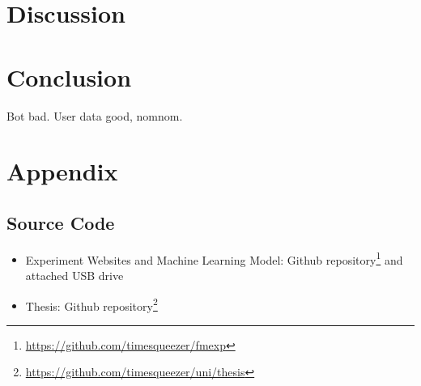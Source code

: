 \documentclass[
    fontsize=12pt,
    headings=small,
    parskip=half,           %
    bibliography=totoc,
    numbers=noenddot,       %
    open=any,               %
    final                   %
]{scrreprt}
\begin{document}
\chapter{Discussion}


\chapter{Conclusion}
Bot bad. User data good, nomnom.


\begin{raggedright}
  \printbibliography
\end{raggedright}

\chapter*{Appendix}

\section*{Source Code}

\begin{itemize}
	\item Experiment Websites and Machine Learning Model: Github repository\footnote{\url{https://github.com/timesqueezer/fmexp}} and attached USB drive
	\item Thesis: Github repository\footnote{\url{https://github.com/timesqueezer/uni/thesis}}
\end{itemize}
\end{document}
